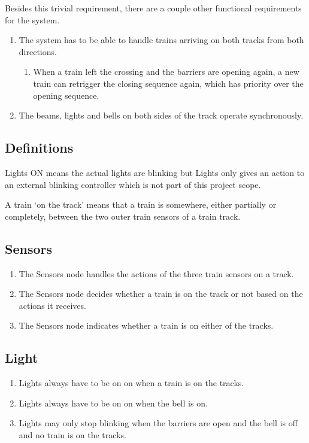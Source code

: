 \documentclass[final]{report}
\begin{document}
Besides this trivial requirement, there are a couple other functional requirements for the system.

\begin{enumerate}
\item The system has to be able to handle trains arriving on both tracks from both directions.
	\begin{enumerate}
	\item When a train left the crossing and the barriers are opening again, a new train can retrigger the closing sequence again, which has priority over the opening sequence.
	\end{enumerate}

\item The beams, lights and bells on both sides of the track operate synchronously.
\end{enumerate}

\subsection{Definitions}
Lights ON means the actual lights are blinking but Lights only gives an action to an external blinking controller which is not part of this project scope.

A train `on the track' means that a train is somewhere, either partially or completely, between the two outer train sensors of a train track.

\subsection{Sensors}
	\begin{enumerate}
		\item The Sensors node handles the actions of the three train sensors on a track.
		\item The Sensors node decides whether a train is on the track or not based on the actions it receives.
		\item The Sensors node indicates whether a train is on either of the tracks.
	\end{enumerate}

\subsection{Light}
	\begin{enumerate}
		\item Lights always have to be on on when a train is on the tracks.
		\item Lights always have to be on on when the bell is on.
		\item Lights may only stop blinking when the barriers are open and the bell is off and no train is on the tracks.
	\end{enumerate}
\end{document}

